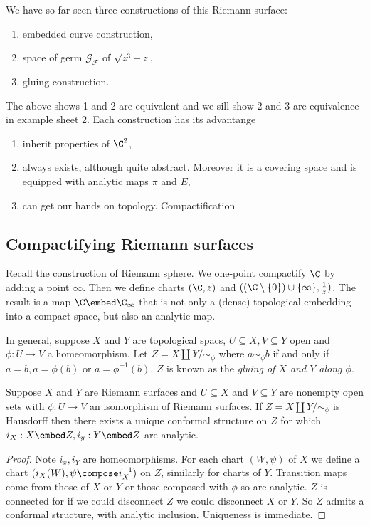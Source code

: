 \documentclass[a4paper]{article}
\begin{document}
We have so far seen three constructions of this Riemann surface:
\begin{enumerate}
\item embedded curve construction,
\item space of germ \(\mathcal G_{\mathcal F}\) of \(\sqrt{z^3 - z}\),
\item gluing construction.
\end{enumerate}
The above shows 1 and 2 are equivalent and we sill show 2 and 3 are equivalence in example sheet 2. Each construction has its advantange
\begin{enumerate}
\item inherit properties of \(\C^2\),
\item always exists, although quite abstract. Moreover it is a covering space and is equipped with analytic maps \(\pi\) and \(E\),
\item can get our hands on topology. Compactification
\end{enumerate}

\subsection{Compactifying Riemann surfaces}

Recall the construction of Riemann sphere. We one-point compactify \(\C\) by adding a point \(\infty\). Then we define charts \((\C, z)\) and \(((\C\setminus \{0\}) \cup \{\infty\}, \frac{1}{z})\). The result is a map \(\C \embed \C_\infty\) that is not only a (dense) topological embedding into a compact space, but also an analytic map.

In general, suppose \(X\) and \(Y\) are topological spacs, \(U \subseteq X, V \subseteq Y\) open and \(\phi: U \to V\) a homeomorphism. Let \(Z = X \amalg Y / \sim_\phi\) where \(a \sim_\phi b\) if and only if \(a = b, a = \phi(b)\) or \(a = \phi^{-1}(b)\). \(Z\) is known as the \emph{gluing of \(X\) and \(Y\) along \(\phi\)}.

\begin{proposition}
  Suppose \(X\) and \(Y\) are Riemann surfaces and \(U \subseteq X\) and \(V \subseteq Y\) are nonempty open sets with \(\phi: U \to V\) an isomorphism of Riemann surfaces. If \(Z = X \amalg Y / \sim_\phi\) is Hausdorff then there exists a unique conformal structure on \(Z\) for which \(i_X: X \embed Z, i_y: Y \embed Z\) are analytic.
\end{proposition}

\begin{proof}
  Note \(i_x, i_Y\) are homeomorphisms. For each chart \((W, \psi)\) of \(X\) we define a chart \((i_X(W), \psi \compose i_X^{-1})\) on \(Z\), similarly for charts of \(Y\). Transition maps come from those of \(X\) or \(Y\) or those composed with \(\phi\) so are analytic. \(Z\) is connected for if we could disconnect \(Z\) we could disconnect \(X\) or \(Y\). So \(Z\) admits a conformal structure, with analytic inclusion. Uniqueness is immediate.
\end{proof}




\printindex
\end{document}
